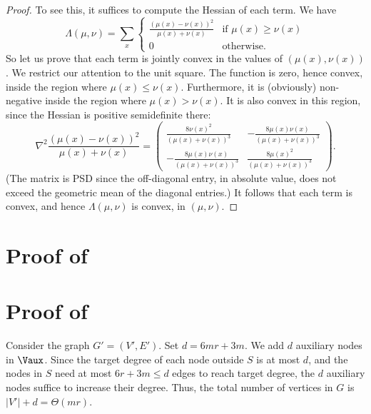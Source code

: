 \begin{proof}
To see this, it suffices to compute the Hessian of each term.
We have
\[
\Lambda(\mu,\nu) = \sum_{x} \begin{cases}
\frac{(\mu(x)-\nu(x))^2}{\mu(x)+\nu(x)} & \text{if } \mu(x) \ge \nu(x)\\
0 & \text{otherwise}.
\end{cases}
\]
So let us prove that each term is jointly convex in the values of $(\mu(x), \nu(x))$. We restrict our attention to the unit square. The function is zero, hence convex, inside the region where $\mu(x) \le \nu(x)$. Furthermore, it is (obviously) non-negative inside the region where $\mu(x) > \nu(x)$. It is also convex in this region, since the Hessian is positive semidefinite there:
 \[
 \nabla^2 \frac{(\mu(x) - \nu(x))^2}{\mu(x)+\nu(x)}  =
\begin{pmatrix}
 \frac{8 \nu(x)^2}{(\mu(x) +\nu(x) )^3} & -\frac{8 \mu(x)  \nu(x) }{(\mu(x) +\nu(x) )^3} \\
 -\frac{8 \mu(x)  \nu(x) }{(\mu(x) +\nu(x) )^3} & \frac{8 \mu(x)^2}{(\mu(x) +\nu(x) )^3}
\end{pmatrix}.
\]
(The matrix is PSD since the off-diagonal entry, in absolute value, does not exceed the geometric mean of the diagonal entries.) It follows that each term is convex, and hence $\Lambda(\mu,\nu)$ is convex, in $(\mu,\nu)$.
\end{proof}



\section{Proof of \texorpdfstring{}{Claim}} \label{sec:proof-direct-sum}



\section{Proof of \texorpdfstring{}{Claim}}\label{app:proof-auxnode-redn}
    Consider the graph $G'=(V',E')$. Set $d=6mr+3m$. We add $d$ auxiliary nodes in $\Vaux$. Since the target degree of each node outside $S$ is at most $d$, and the nodes in $S$ need at most $6r+3m\leq d$ edges to reach target degree, the $d$ auxiliary nodes suffice to increase their degree. Thus, the total number of vertices in $G$ is $|V'|+d=\Theta(mr)$. 
    
